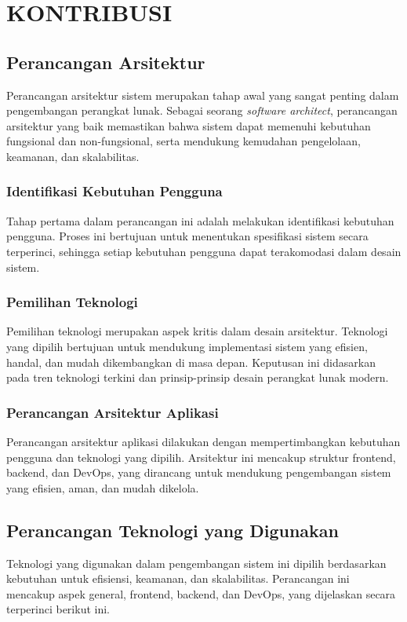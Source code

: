 \chapter{KONTRIBUSI}
\sloppy

\section{Perancangan Arsitektur}

Perancangan arsitektur sistem merupakan tahap awal yang sangat penting dalam pengembangan perangkat lunak. Sebagai seorang \emph{software architect}, perancangan arsitektur yang baik memastikan bahwa sistem dapat memenuhi kebutuhan fungsional dan non-fungsional, serta mendukung kemudahan pengelolaan, keamanan, dan skalabilitas. 

\subsection{Identifikasi Kebutuhan Pengguna}
Tahap pertama dalam perancangan ini adalah melakukan identifikasi kebutuhan pengguna. Proses ini bertujuan untuk menentukan spesifikasi sistem secara terperinci, sehingga setiap kebutuhan pengguna dapat terakomodasi dalam desain sistem.

\subsection{Pemilihan Teknologi}
Pemilihan teknologi merupakan aspek kritis dalam desain arsitektur. Teknologi yang dipilih bertujuan untuk mendukung implementasi sistem yang efisien, handal, dan mudah dikembangkan di masa depan. Keputusan ini didasarkan pada tren teknologi terkini dan prinsip-prinsip desain perangkat lunak modern.

\subsection{Perancangan Arsitektur Aplikasi}
Perancangan arsitektur aplikasi dilakukan dengan mempertimbangkan kebutuhan pengguna dan teknologi yang dipilih. Arsitektur ini mencakup struktur frontend, backend, dan DevOps, yang dirancang untuk mendukung pengembangan sistem yang efisien, aman, dan mudah dikelola.

\section{Perancangan Teknologi yang Digunakan}
Teknologi yang digunakan dalam pengembangan sistem ini dipilih berdasarkan kebutuhan untuk efisiensi, keamanan, dan skalabilitas. Perancangan ini mencakup aspek general, frontend, backend, dan DevOps, yang dijelaskan secara terperinci berikut ini.

